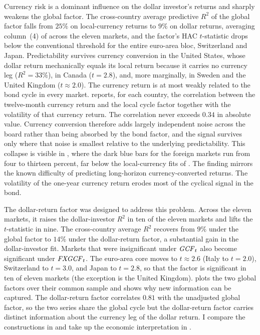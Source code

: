 Currency risk is a dominant influence on the dollar investor's
returns and sharply weakens the global factor. The cross-country average
predictive $R^{2}$ of the global factor falls from $25\%$ on local-currency
returns to $9\%$ on dollar returns, averaging column~(4) of
 across the eleven markets, and the factor's HAC $t$-statistic drops
below the conventional threshold for the entire euro-area bloc, Switzerland and
Japan. Predictability survives currency conversion in the United States, whose dollar
return mechanically equals its local return because it carries no currency leg
($R^{2}=33\%$), in Canada ($t=2.8$), and, more marginally, in Sweden and the
United Kingdom ($t\approx 2.0$). The currency return is at most weakly related
to the bond cycle in every market.  reports, for each country,
the correlation between the twelve-month currency return and the local cycle
factor together with the volatility of that currency return. The correlation
never exceeds $0.34$ in absolute value. Currency
conversion therefore adds largely independent noise across the board rather than
being absorbed by the bond factor, and the signal survives only where that noise
is smallest relative to the underlying predictability. This collapse is visible
in , where the dark blue bars for the foreign markets run from
four to thirteen percent, far below the local-currency fits of
. The finding mirrors the known difficulty of predicting
long-horizon currency-converted returns. The volatility of the one-year currency return erodes most of the cyclical
signal in the bond.

The dollar-return factor was designed to address this problem. Across the eleven markets, it raises the dollar-investor
$R^{2}$ in ten of the eleven markets and lifts the $t$-statistic in nine.
The cross-country average $R^{2}$ recovers from $9\%$ under the global factor
to $14\%$ under the dollar-return factor, a substantial gain in the
dollar-investor fit. Markets that were insignificant under
$\mathit{GCF}_{t}$ also become significant under $\mathit{FXGCF}_{t}$. The euro-area core
moves to $t\approx 2.6$ (Italy to $t=2.0$), Switzerland to $t=3.0$, and Japan to $t=2.8$, so
that the factor is significant in ten of eleven markets (the exception is the
United Kingdom).  plots the two global factors over their common sample and
shows why new information can be captured. The dollar-return factor correlates $0.81$ with the
unadjusted global factor, so the two series share the global cycle but the
dollar-return factor carries distinct information about the currency
leg of the dollar return. I compare the
constructions in  and take up the economic
interpretation in .

